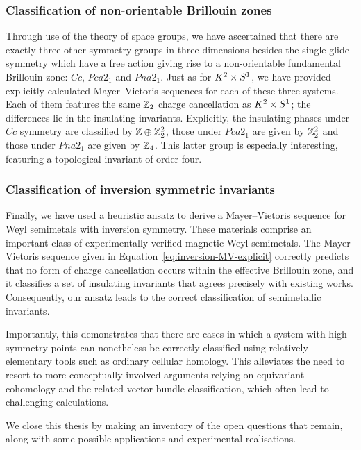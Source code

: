 \subsubsection{Classification of non-orientable Brillouin zones}

Through use of the theory of space groups, we have ascertained that there are exactly three other symmetry groups in three dimensions besides the single glide symmetry which have a free action giving rise to a non-orientable fundamental Brillouin zone: $Cc$, $Pca2_1$ and $Pna2_1$. Just as for $K^2\times S^1$, we have provided explicitly calculated Mayer--Vietoris sequences for each of these three systems. Each of them features the same $\mathbb{Z}_2$ charge cancellation as $K^2\times S^1$; the differences lie in the insulating invariants. Explicitly, the insulating phases under $Cc$ symmetry are classified by $\mathbb{Z}\oplus\mathbb{Z}_2^2$, those under $Pca2_1$ are given by $\mathbb{Z}_2^2$ and those under $Pna2_1$ are given by $\mathbb{Z}_4$. This latter group is especially interesting, featuring a topological invariant of order four.

\subsubsection{Classification of inversion symmetric invariants}

Finally, we have used a heuristic ansatz to derive a Mayer--Vietoris sequence for Weyl semimetals with inversion symmetry. These materials comprise an important class of experimentally verified magnetic Weyl semimetals. The Mayer--Vietoris sequence given in Equation~\eqref{eq:inversion-MV-explicit} correctly predicts that no form of charge cancellation occurs within the effective Brillouin zone, and it classifies a set of insulating invariants that agrees precisely with existing works. Consequently, our ansatz leads to the correct classification of semimetallic invariants.

Importantly, this demonstrates that there are cases in which a system with high-symmetry points can nonetheless be correctly classified using relatively elementary tools such as ordinary cellular homology. This alleviates the need to resort to more conceptually involved arguments relying on equivariant cohomology and the related vector bundle classification, which often lead to challenging calculations.


\label{sec:outlook}

We close this thesis by making an inventory of the open questions that remain, along with some possible applications and experimental realisations.

